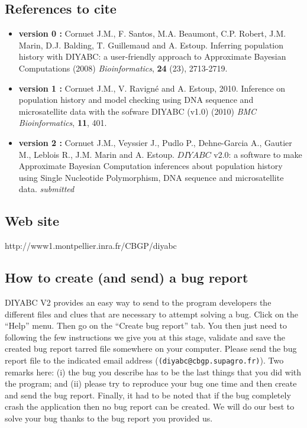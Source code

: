\documentclass [a4paper]{report}
\let\subsectionv\subsection
\renewcommand{\subsection}[1]{\subsectionv{#1} \setcounter{paragraph}{0}}
\begin{document}
\subsection{References to cite}
\begin{itemize}
\item \textbf{version 0 :} Cornuet J.M., F. Santos, M.A. Beaumont, C.P. Robert, J.M. Marin, D.J. Balding, T. Guillemaud and A. Estoup. Inferring population history with DIYABC: a user-friendly approach to Approximate Bayesian Computations (2008) \emph{Bioinformatics}, \textbf{24} (23), 2713-2719.
\item  \textbf{version 1 :}  Cornuet J.M., V. Ravign\'e and A. Estoup, 2010. Inference on population history and model checking using DNA sequence and microsatellite data with the sofware DIYABC (v1.0) (2010) \emph{BMC Bioinformatics}, \textbf{11}, 401.
\item  \textbf{version 2 :}  Cornuet J.M., Veyssier J., Pudlo P., Dehne-Garcia A., Gautier M., Leblois R., J.M. Marin and A. Estoup. $DIYABC$ v2.0: a software to make Approximate Bayesian Computation inferences about population history using Single Nucleotide Polymorphism, DNA sequence and microsatellite data. \emph{submitted}
\end{itemize}
\subsection{Web site}
http://www1.montpellier.inra.fr/CBGP/diyabc\\

\subsection{How to create (and send) a bug report}
DIYABC V2 provides an easy way to send to the program developers the different files and clues that are necessary to attempt solving a bug. Click on the “Help” menu. Then go on the “Create bug report” tab. You then just need to following the few instructions we give you at this stage, validate and save the created bug report tarred file somewhere on your computer. Please send the bug report file to the indicated email address (\texttt{(diyabc@cbgp.supagro.fr)}). Two remarks here: (i) the bug you describe has to be the last things that you did with the program; and (ii) please try to reproduce your bug one time and then create and send the bug report. Finally, it had to be noted that if the bug completely crash the application then no bug report can be created. We will do our best to solve your bug thanks to the bug report you provided us.
\end{document}

